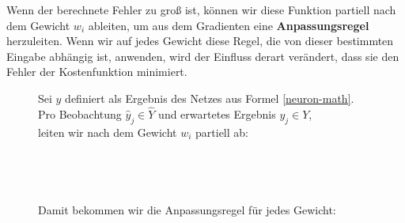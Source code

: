                 \noindent
                Wenn der berechnete Fehler zu groß ist, können wir diese Funktion partiell nach dem Gewicht $w_i$ ableiten, um aus dem Gradienten eine \textbf{Anpassungsregel} herzuleiten. Wenn wir auf jedes Gewicht diese Regel, die von dieser bestimmten Eingabe abhängig ist, anwenden, wird der Einfluss derart verändert, dass sie den Fehler der Kostenfunktion minimiert.

                \begin{figure}[H]
                    \begin{mdframed}
                        \noindent
                        Sei $\widehat{y}$ definiert als Ergebnis des Netzes aus Formel \ref{neuron-math}. \\
                        Pro Beobachtung $\widehat{y}_j \in \widehat{Y}$ und erwartetes Ergebnis $y_j \in Y$, \\
                        leiten wir nach dem Gewicht $w_i$ partiell ab:\\[4mm]
    \hspace*{40mm}  \\[2mm]
    \hspace*{62.3mm}  \\[2mm]
    \hspace*{62.3mm}  \\[2mm]
    \hspace*{62.3mm} \\[4mm]
                        Damit bekommen wir die Anpassungsregel für jedes Gewicht:\\[4mm]
                        \hspace*{40mm} 
\end{mdframed}
\end{figure}
